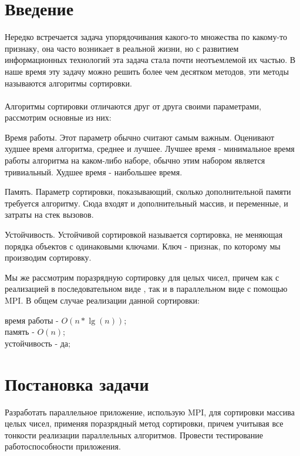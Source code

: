 \documentclass{report}
\begin{document}
\setcounter{page}{2}

\tableofcontents
\newpage

\section*{Введение}
\par Нередко встречается задача упорядочивания какого-то множества по какому-то признаку, она часто возникает в реальной жизни, но с развитием информационных технологий эта задача стала почти неотъемлемой  их частью. В наше время эту задачу можно решить более чем десятком методов, эти методы называются алгоритмы сортировки. \\ \\
Алгоритмы сортировки отличаются друг от друга своими параметрами, рассмотрим основные из них:

Время работы.
Этот параметр обычно считают самым важным. Оценивают худшее время алгоритма, среднее и лучшее. Лучшее время - минимальное время работы алгоритма на каком-либо наборе, обычно этим набором является тривиальный. Худшее время - наибольшее время.  

Память.
Параметр сортировки, показывающий, сколько дополнительной памяти требуется алгоритму. Сюда входят и дополнительный массив, и переменные, и затраты на стек вызовов.

Устойчивость.
Устойчивой сортировкой называется сортировка, не меняющая порядка объектов с одинаковыми ключами. Ключ - признак, по которому мы производим сортировку.

Мы же рассмотрим поразрядную сортировку для целых чисел, причем как с реализацией в последовательном виде , так и в параллельном виде с помощью MPI. В общем случае реализации данной сортировки:

\begin{center}
время работы - $O(n*\lg(n))$;\\
память - $O(n)$;\\
устойчивость - да;
\end{center}

\newpage

\section*{Постановка задачи}
\par Разработать параллельное приложение, использую MPI,  для сортировки массива целых чисел, применяя поразрядный метод сортировки, причем учитывая все тонкости реализации параллельных алгоритмов.
Провести тестирование работоспособности приложения.
\newpage
\end{document}
